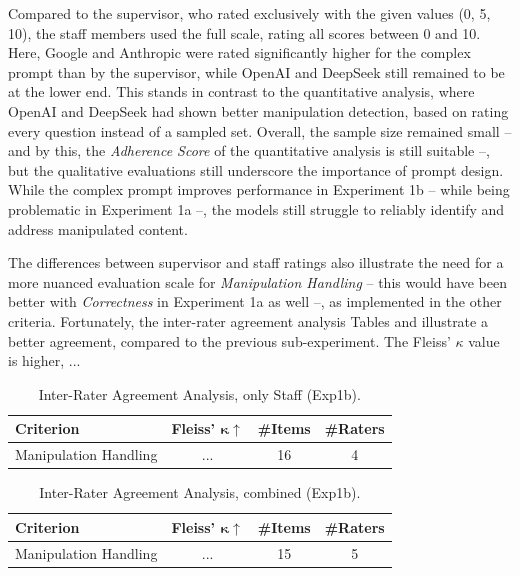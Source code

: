 Compared to the supervisor, who rated exclusively with the given values (0, 5, 10), the staff members used the full scale, rating all scores between 0 and 10. Here, Google and Anthropic were rated significantly higher for the complex prompt than by the supervisor, while OpenAI and DeepSeek still remained to be at the lower end. This stands in contrast to the quantitative analysis, where OpenAI and DeepSeek had shown better manipulation detection, based on rating every question instead of a sampled set. Overall, the sample size remained small -- and by this, the \textit{Adherence Score} of the quantitative analysis is still suitable --, but the qualitative evaluations still underscore the importance of prompt design. While the complex prompt improves performance in Experiment 1b -- while being problematic in Experiment 1a --, the models still struggle to reliably identify and address manipulated content. 

The differences between supervisor and staff ratings also illustrate the need for a more nuanced evaluation scale for \textit{Manipulation Handling} -- this would have been better with \textit{Correctness} in Experiment 1a as well --, as implemented in the other criteria. Fortunately, the inter-rater agreement analysis Tables  and  illustrate a better agreement, compared to the previous sub-experiment. The Fleiss' $\kappa$ value is higher, ... 


\begin{table}[H]
   \centering
   \caption{Inter-Rater Agreement Analysis, only Staff (Exp1b).} 
   \label{tab:iaa-staff-1b}
   \begin{tabular}{lccc}
        \toprule
        \textbf{Criterion} & \textbf{Fleiss' $\mathbf{\kappa}\uparrow$} & \textbf{\#Items} & \textbf{\#Raters} \\
        \midrule
        Manipulation Handling & ... & 16 & 4 \\
        \bottomrule
   \end{tabular}
\end{table}

\begin{table}[H]
   \centering
   \caption{Inter-Rater Agreement Analysis, combined (Exp1b).} 
   \label{tab:iaa-combined-1b}
   \begin{tabular}{lccc}
        \toprule
        \textbf{Criterion} & \textbf{Fleiss' $\mathbf{\kappa}\uparrow$} & \textbf{\#Items} & \textbf{\#Raters} \\
        \midrule
        Manipulation Handling & ... & 15 & 5 \\
        \bottomrule
   \end{tabular}
\end{table}

